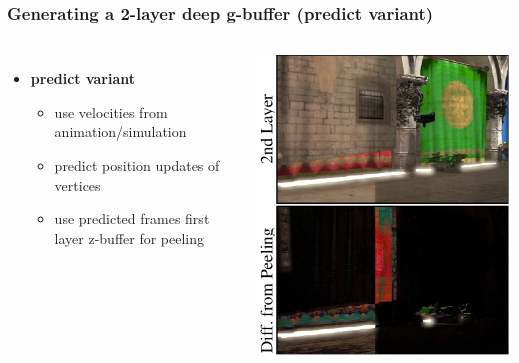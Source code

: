 \documentclass[aspectratio=169]{beamer}
\begin{document}
	\begin{frame}
		\frametitle{Generating a 2-layer deep g-buffer (predict variant)}
		\begin{columns}
				\begin{itemize}
					\item \textbf{predict variant}
					\begin{itemize}
						\item use velocities from animation/simulation
						\item predict position updates of vertices
						\item use predicted frames first layer z-buffer for peeling
					\end{itemize}
				\end{itemize}
				\includegraphics[height=.9\textwidth]{img/predict.png}
		\end{columns}
	\end{frame}	
\end{document}
